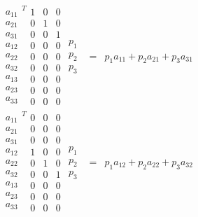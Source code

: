 \documentclass{article}
\begin{document}
\begin{eqnarray*}
\begin{array}{c}
a_{11} \\ 
a_{21} \\ 
a_{31} \\ 
a_{12} \\ 
a_{22} \\ 
a_{32} \\ 
a_{13} \\ 
a_{23} \\ 
a_{33}%
\end{array}%
^{T}%
\begin{array}{ccc}
1 & 0 & 0 \\ 
0 & 1 & 0 \\ 
0 & 0 & 1 \\ 
0 & 0 & 0 \\ 
0 & 0 & 0 \\ 
0 & 0 & 0 \\ 
0 & 0 & 0 \\ 
0 & 0 & 0 \\ 
0 & 0 & 0%
\end{array}%
\begin{array}{c}
p_{1} \\ 
p_{2} \\ 
p_{3}%
\end{array}
&=&p_{1}a_{11}+p_{2}a_{21}+p_{3}a_{31} \\
\begin{array}{c}
a_{11} \\ 
a_{21} \\ 
a_{31} \\ 
a_{12} \\ 
a_{22} \\ 
a_{32} \\ 
a_{13} \\ 
a_{23} \\ 
a_{33}%
\end{array}%
^{T}%
\begin{array}{ccc}
0 & 0 & 0 \\ 
0 & 0 & 0 \\ 
0 & 0 & 0 \\ 
1 & 0 & 0 \\ 
0 & 1 & 0 \\ 
0 & 0 & 1 \\ 
0 & 0 & 0 \\ 
0 & 0 & 0 \\ 
0 & 0 & 0%
\end{array}%
\begin{array}{c}
p_{1} \\ 
p_{2} \\ 
p_{3}%
\end{array}
&=&p_{1}a_{12}+p_{2}a_{22}+p_{3}a_{32}
\end{eqnarray*}%
\end{document}
